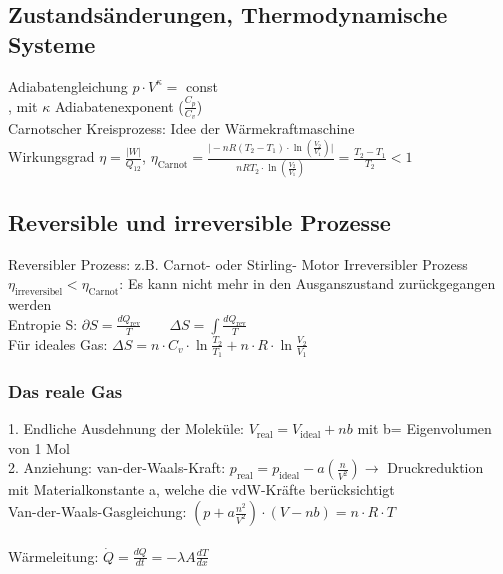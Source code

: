 \documentclass[fs, footer]{latex4ei}
\begin{document}
\begin{multicols*}{4}
\subsection{Zustandsänderungen, Thermodynamische Systeme}
Adiabatengleichung $p\cdot V^\kappa =$ const\\, mit $\kappa$ Adiabatenexponent ($\frac{C_p}{C_v}$)\\
Carnotscher Kreisprozess: Idee der Wärmekraftmaschine\\
Wirkungsgrad $\eta = \frac{\vert W\vert}{Q_{12}}$, $\eta_{\text{Carnot}} = \frac{\vert - n R(T_2-T_1)\cdot\ln(\frac{V_2}{V_1})\vert}{n RT_2\cdot\ln(\frac{V_2}{V_1})} = \frac{T_2-T_1}{T_2} < 1$\\
\subsection{Reversible und irreversible Prozesse}
Reversibler Prozess: z.B. Carnot- oder Stirling- Motor %
Irreversibler Prozess $\eta_{\text{irreversibel}} < \eta_{\text{Carnot}}$: Es kann nicht mehr in den Ausganszustand zurückgegangen werden\\

Entropie S: $\partial S = \frac{dQ_{\text{rev}}}{T} \qquad \Delta S = \int \frac{dQ_{\text{rev}}}{T}$\\
Für ideales Gas: $\Delta S = n\cdot C_v\cdot\ln\frac{T_2}{T_1} + n\cdot R\cdot\ln\frac{V_2}{V_1}$\\
\subsubsection{Das reale Gas}
1. Endliche Ausdehnung der Moleküle: $V_{\text{real}} = V_{\text{ideal}} + nb$ mit b= Eigenvolumen von 1 Mol\\
2. Anziehung: van-der-Waals-Kraft: $p_{\text{real}} = p_{\text{ideal}} - a(\frac{n}{V^2}) \rightarrow$ Druckreduktion\\
mit Materialkonstante a, welche die vdW-Kräfte berücksichtigt\\

Van-der-Waals-Gasgleichung: $(p+a\frac{n^2}{V^2})\cdot(V-nb) = n\cdot R\cdot T$\\
\\
Wärmeleitung: $\dot Q = \frac{dQ}{dt} = - \lambda  A \frac{dT}{dx}$\\



\end{multicols*}
\end{document}
